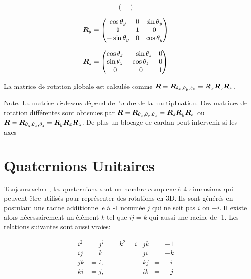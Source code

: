 \documentclass[12pt,a4paper]{report}
\begin{document}
\begin{appendix}
\begin{equation*}
\begin{pmatrix}
		\end{pmatrix}
		\end{equation*}
		
		\begin{equation*}
		\boldsymbol{R}_y = \begin{pmatrix}
		\cos{\theta_y} & 0 & \sin{\theta_y}\\
		0 & 1 & 0 \\
		-\sin{\theta_y} &  0 & \cos{\theta_y}
		\end{pmatrix}
		\end{equation*}
		
		\begin{equation*}
		\boldsymbol{R}_z = \begin{pmatrix}
		\cos{\theta_z} & -\sin{\theta_z}& 0 \\
		\sin{\theta_z} & \cos{\theta_z} & 0 \\
		0 & 0 & 1
		\end{pmatrix}
 		\end{equation*}
 		
 		\para La matrice de rotation globale est calculée comme $\boldsymbol{R} = \boldsymbol{R}_{\theta_x, \theta_y, \theta_z} = \boldsymbol{R}_x \boldsymbol{R}_y \boldsymbol{R}_z$.
 		
 		\para Note: La matrice ci-dessus dépend de l'ordre de la multiplication. Des matrices de rotation différentes sont obtenues par $\boldsymbol{R} = \boldsymbol{R}_{\theta_z, \theta_y, \theta_x} = \boldsymbol{R}_z \boldsymbol{R}_y \boldsymbol{R}_x$ ou $\boldsymbol{R} = \boldsymbol{R}_{\theta_y, \theta_x, \theta_z} = \boldsymbol{R}_y \boldsymbol{R}_x \boldsymbol{R}_z$. De plus un blocage de cardan peut intervenir si les axes 
		
		\section{Quaternions Unitaires}
		Toujours selon \cite{nuchter_3d_2009}, les quaternions sont un nombre complexe à 4 dimensions qui peuvent être utilisés pour représenter des rotations en 3D. Ils sont générés en postulant une racine additionnelle à -1 nommée $j$ qui ne soit pas $i$ ou $-i$. Il existe alors nécessairement un élément $k$ tel que $ij = k$ qui aussi une racine de -1. Les relations suivantes sont aussi vraies:
		

		\begin{equation*}
		\begin{aligned}
			i^2&= j^2 & = k^2 = i&jk &=& -1 \\
			ij &= k, &           &ji &=& -k \\
			jk &= i,&            &kj &=& -i \\
			ki &=j, &            &ik &=& -j
		\end{aligned}
		\end{equation*}
		

\end{appendix}
\end{document}
